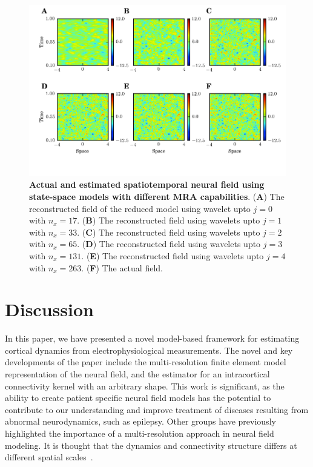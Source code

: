 \documentclass[review,authoryear,3p]{elsarticle}
\newcommand{\dean}[1]{\textcolor{green}{#1}}
\begin{document}
\begin{figure}[t]
	\centering
		\includegraphics[scale=1]{./Graph/fig12.pdf}
	\caption{{\bf Actual and estimated spatiotemporal neural field using state-space models with different MRA capabilities}. (\textbf{A}) The reconstructed field of the reduced model using wavelet upto $j=0$ with $n_x=17$. (\textbf{B}) The reconstructed field using wavelets upto $j=1$ with $n_x=33$. (\textbf{C}) The reconstructed field  using wavelets upto $j=2$ with $n_x=65$. (\textbf{D}) The reconstructed field using wavelets upto $j=3$ with $n_x=131$. (\textbf{E}) The reconstructed field using wavelets upto $j=4$ with $n_x=263$. (\textbf{F}) The actual field.} 
\label{fig:FieldEstimation}
\end{figure}
\section{Discussion}
In this paper, we have presented a novel model-based framework for estimating cortical dynamics from electrophysiological measurements. The novel and key developments of the paper include the multi-resolution finite element model representation of the neural field, and the estimator for an intracortical connectivity kernel with an arbitrary shape. This work is significant, as the ability to create patient specific neural field models has the potential to contribute to our understanding and improve treatment of diseases resulting from abnormal neurodynamics, such as epilepsy. Other groups have previously highlighted the importance of a multi-resolution approach in neural field modeling. It is thought that the dynamics and connectivity structure differs at different spatial scales~\citep{Qubbaj2009,Breakspear2005,Schultze-Kraft2010}. %
\end{document}
